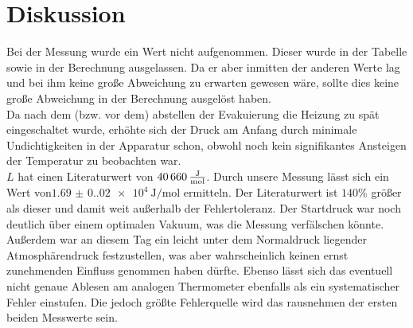 \section{Diskussion}
\label{sec:Diskussion}

Bei der Messung wurde ein Wert nicht aufgenommen. Dieser wurde in der Tabelle sowie in der Berechnung ausgelassen. 
Da er aber inmitten der anderen Werte lag und bei ihm keine große Abweichung zu erwarten gewesen wäre, sollte dies keine große Abweichung in der 
Berechnung ausgelöst haben.\\
Da nach dem (bzw. vor dem) abstellen der Evakuierung die Heizung zu spät eingeschaltet wurde, erhöhte sich der Druck am Anfang durch 
minimale Undichtigkeiten in der Apparatur schon, obwohl noch kein signifikantes Ansteigen der Temperatur zu beobachten war.\\ \noindent
$L$ hat einen Literaturwert von $\SI{40 660}{\frac{\joule}{\mol}}$\cite{Gaskonstante}.
Durch unsere Messung lässt sich ein Wert von$\SI{1.69(0.02)e4}{\joule\per\mol}$ ermitteln.
Der Literaturwert ist $140\%$ größer als dieser und damit weit außerhalb der Fehlertoleranz. \noindent
Der Startdruck war noch deutlich über einem optimalen Vakuum, was die Messung  verfälschen könnte.
Außerdem war an diesem Tag ein leicht unter dem Normaldruck liegender Atmosphärendruck festzustellen, was aber
wahrscheinlich keinen ernst zunehmenden Einfluss genommen haben dürfte.
Ebenso lässt sich das eventuell nicht genaue
Ablesen am analogen Thermometer ebenfalls als ein systematischer Fehler einstufen. Die jedoch größte Fehlerquelle wird
das rausnehmen der ersten beiden Messwerte sein.